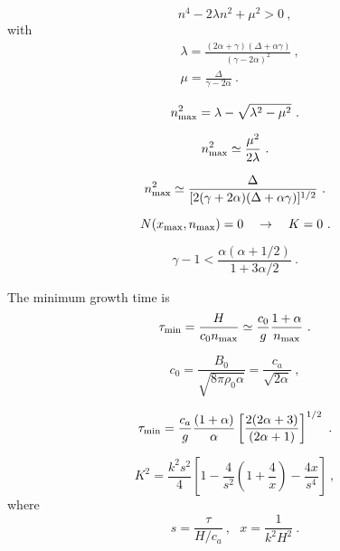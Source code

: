 \documentclass[12pt,a4paper]{article}
\begin{document}
\begin{equation}
n^4 -2\lambda n^2 +\mu^2 > 0 ~,
\end{equation}
with
\begin{align*}
& \lambda = \frac{(2\alpha+\gamma)(\Delta +\alpha\gamma)}{(\gamma -2\alpha)^2} ~, \\
& \mu = \frac{\Delta}{\gamma -2\alpha} ~.
\end{align*}

\begin{equation}
n_{\rm max}^2 = \lambda -\sqrt{\lambda^2 -\mu^2}  ~.
\end{equation}

\begin{equation}
n_{\rm max}^2 \simeq \frac{\mu^2}{2\lambda}   ~.
\end{equation}

\begin{equation}
n_{\rm max}^2 \simeq \frac{\Delta}{[2(\gamma+2\alpha)(\Delta+\alpha\gamma)]^{1/2} }  ~.
\end{equation}

\begin{equation}
N(x_{\rm max}, n_{\rm max} ) = 0~~~ \rightarrow ~~~ K = 0 ~.
\end{equation}

\begin{equation}
\gamma -1 < \frac{\alpha(\alpha+1/2)}{1+3\alpha/2} ~.
\end{equation}

The minimum growth time is
\begin{equation*}
\tau_{\rm min} = \frac{H}{c_0 n_{\rm max} } \simeq \frac{c_0}{g} \frac{1+\alpha}{n_{\rm max}} ~.
\end{equation*}

\begin{equation*}
c_0 = \frac{B_0}{ \sqrt{8\pi \rho_0 \alpha} } = \frac{c_a}{\sqrt{2\alpha} } ~,
\end{equation*}

\begin{equation}
\tau_{\rm min} = \frac{c_a}{g} \frac{(1+\alpha)}{\alpha} \left[\frac{2(2\alpha+3)}{(2\alpha+1)} \right]^{1/2} ~.
\end{equation}

\begin{equation*}
K^2 = \frac{k^2 s^2}{4} \left[1- \frac{4}{s^2}\left(1+\frac{4}{x} \right) -\frac{4x}{s^4}  \right] ~,
\end{equation*}
where
\begin{equation}
s = \frac{\tau}{H/c_a} ~, ~~~ x = \frac{1}{k^2 H^2} ~.
\end{equation}
\end{document}
